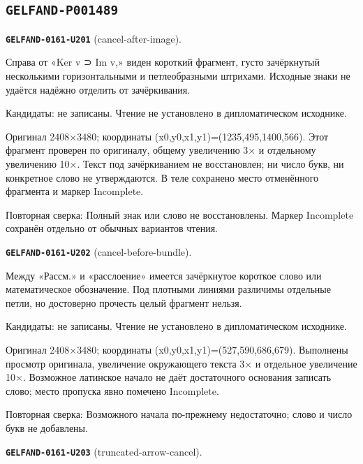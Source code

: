 \subsection*{\texttt{GELFAND-P001489}}
\par\noindent\leavevmode{}\label{GELFAND-0161-U201}\label{GELFAND-P001489:cancel-after-image}\textbf{\texttt{GELFAND-0161-U201}} (cancel-after-image).\nopagebreak[4]\par
Справа от «Ker v ⊃ Im v,» виден короткий фрагмент, густо зачёркнутый несколькими горизонтальными и петлеобразными штрихами. Исходные знаки не удаётся надёжно отделить от зачёркивания.\par
Кандидаты: не записаны. Чтение не установлено в дипломатическом исходнике.\par
Оригинал 2408×3480; координаты (x0,y0,x1,y1)=(1235,495,1400,566). Этот фрагмент проверен по оригиналу, общему увеличению 3× и отдельному увеличению 10×. Текст под зачёркиванием не восстановлен; ни число букв, ни конкретное слово не утверждаются. В теле сохранено место отменённого фрагмента и маркер Incomplete.\par
Повторная сверка: Полный знак или слово не восстановлены. Маркер Incomplete сохранён отдельно от обычных вариантов чтения.\par\medskip
\par\noindent\leavevmode{}\label{GELFAND-0161-U202}\label{GELFAND-P001489:cancel-before-bundle}\textbf{\texttt{GELFAND-0161-U202}} (cancel-before-bundle).\nopagebreak[4]\par
Между «Рассм.» и «расслоение» имеется зачёркнутое короткое слово или математическое обозначение. Под плотными линиями различимы отдельные петли, но достоверно прочесть целый фрагмент нельзя.\par
Кандидаты: не записаны. Чтение не установлено в дипломатическом исходнике.\par
Оригинал 2408×3480; координаты (x0,y0,x1,y1)=(527,590,686,679). Выполнены просмотр оригинала, увеличение окружающего текста 3× и отдельное увеличение 10×. Возможное латинское начало не даёт достаточного основания записать слово; место пропуска явно помечено Incomplete.\par
Повторная сверка: Возможного начала по-прежнему недостаточно; слово и число букв не добавлены.\par\medskip
\par\noindent\leavevmode{}\label{GELFAND-0161-U203}\label{GELFAND-P001489:truncated-arrow-cancel}\textbf{\texttt{GELFAND-0161-U203}} (truncated-arrow-cancel).\nopagebreak[4]\par
